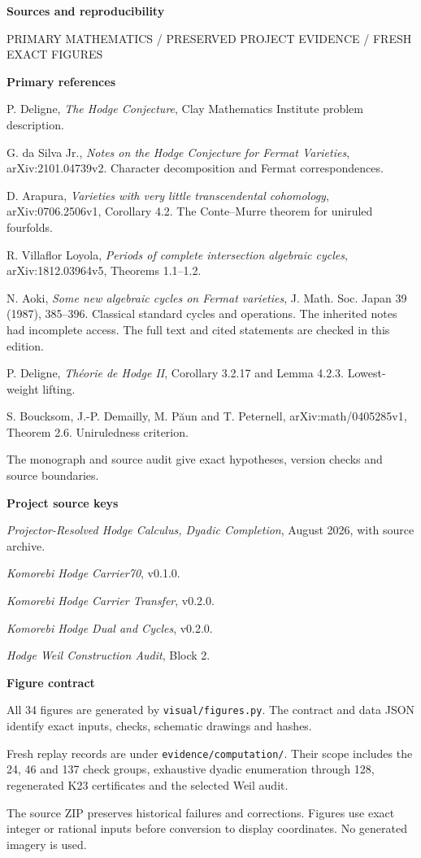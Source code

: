 \documentclass[11pt]{article}
\begin{document}
\clearpage
{\fontsize{22}{26}\selectfont\bfseries\color{Ink}Sources and reproducibility}\par
{\sffamily\small\color{Gray}PRIMARY MATHEMATICS / PRESERVED PROJECT EVIDENCE / FRESH EXACT FIGURES}\par
\vspace{4mm}
\begin{minipage}[t]{0.48\linewidth}\small
\textbf{Primary references}\par
[1] P. Deligne, \emph{The Hodge Conjecture}, Clay Mathematics Institute problem description.\par
[2] G. da Silva Jr., \emph{Notes on the Hodge Conjecture for Fermat Varieties}, arXiv:2101.04739v2. Character decomposition and Fermat correspondences.\par
[3] D. Arapura, \emph{Varieties with very little transcendental cohomology}, arXiv:0706.2506v1, Corollary 4.2. The Conte--Murre theorem for uniruled fourfolds.\par
[4] R. Villaflor Loyola, \emph{Periods of complete intersection algebraic cycles}, arXiv:1812.03964v5, Theorems 1.1--1.2.\par
[5] N. Aoki, \emph{Some new algebraic cycles on Fermat varieties}, J. Math. Soc. Japan 39 (1987), 385--396. Classical standard cycles and operations. The inherited notes had incomplete access. The full text and cited statements are checked in this edition.\par
[6] P. Deligne, \emph{Th\'eorie de Hodge II}, Corollary 3.2.17 and Lemma 4.2.3. Lowest-weight lifting.\par
[7] S. Boucksom, J.-P. Demailly, M. P\u{a}un and T. Peternell, arXiv:math/0405285v1, Theorem 2.6. Uniruledness criterion.\par
The monograph and source audit give exact hypotheses, version checks and source boundaries.
\end{minipage}\hfill
\begin{minipage}[t]{0.48\linewidth}\small
\textbf{Project source keys}\par
[A] \emph{Projector-Resolved Hodge Calculus, Dyadic Completion}, August 2026, with source archive.\par
[C] \emph{Komorebi Hodge Carrier70}, v0.1.0.\par
[T] \emph{Komorebi Hodge Carrier Transfer}, v0.2.0.\par
[D] \emph{Komorebi Hodge Dual and Cycles}, v0.2.0.\par
[W] \emph{Hodge Weil Construction Audit}, Block 2.\par
\textbf{Figure contract}\par
All 34 figures are generated by \texttt{visual/figures.py}. The contract and data JSON identify exact inputs, checks, schematic drawings and hashes.\par
Fresh replay records are under \texttt{evidence/computation/}. Their scope includes the 24, 46 and 137 check groups, exhaustive dyadic enumeration through 128, regenerated K23 certificates and the selected Weil audit.\par
The source ZIP preserves historical failures and corrections. Figures use exact integer or rational inputs before conversion to display coordinates. No generated imagery is used.
\end{minipage}
\end{document}
